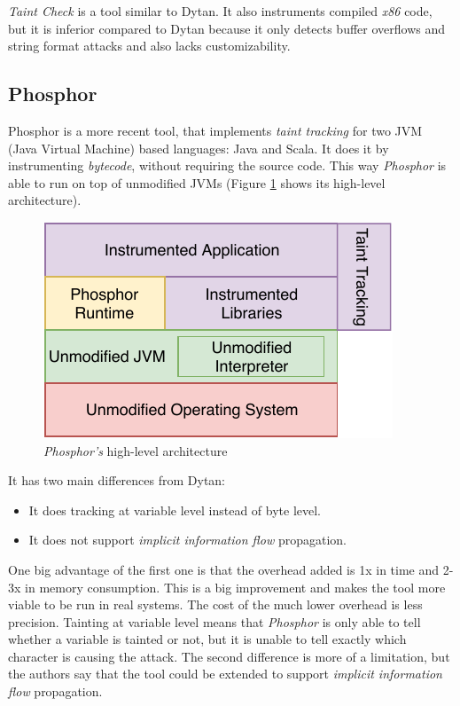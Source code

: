 \textit{Taint Check} \cite{taintcheck} is a tool similar to Dytan. It also instruments compiled \textit{x86} code, but it is inferior compared to Dytan because it only detects buffer overflows and string format attacks and also lacks customizability.



\subsection{Phosphor} 
Phosphor \cite{phosphor} is a more recent tool, that implements \textit{taint tracking} for two JVM (Java Virtual Machine) based languages: Java  and Scala. It does it by instrumenting \textit{bytecode}, without requiring the source code. This way \textit{Phosphor} is able to run on top of unmodified JVMs (Figure \ref{phosphorfig} shows its high-level architecture).

\begin{figure}[h]
\centering
\includegraphics[scale=1]{images/PhosphorArchitecture.pdf}
\caption{\textit{Phosphor's} high-level architecture} \label{phosphorfig}
\end{figure}

It has two main differences from Dytan: 
\begin{itemize}
    \item It does tracking at variable level instead of byte level.
    \item It does not support \textit{implicit information flow} propagation.
\end{itemize}
One big advantage of the first one is that the overhead added is 1x in time and 2-3x in memory consumption. This is a big improvement and makes the tool more viable to be run in real systems. The cost of the much lower overhead is less precision. Tainting at variable level means that \textit{Phosphor} is only able to tell whether a variable is tainted or not, but it is unable to tell exactly which character is causing the attack.
The second difference is more of a limitation, but the authors say that the tool could be extended to support \textit{implicit information flow} propagation.


